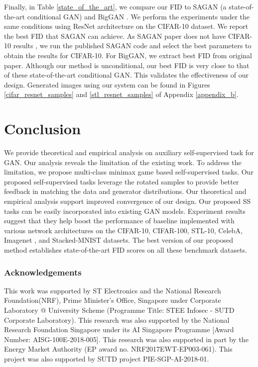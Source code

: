 \documentclass{article}
\begin{document}
Finally, in Table \ref{state_of_the_art}, we compare our FID to SAGAN \cite{zhang-arxiv-2018} (a state-of-the-art conditional GAN) and BigGAN \cite{brock-iclr-2018}. We perform the experiments under the same conditions using ResNet architecture on the  CIFAR-10 dataset. We report the best FID that SAGAN can achieve. As SAGAN paper does not have CIFAR-10 results \cite{zhang-arxiv-2018}, we run the published SAGAN code and select the best parameters to obtain the results for CIFAR-10. For BigGAN, we extract best FID from original paper. Although our method is unconditional, our best FID is very close  to that of these state-of-the-art conditional GAN. This validates the effectiveness of our design. 
Generated images using our system can be found in 
Figures \ref{cifar_resnet_samples} and \ref{stl_resnet_samples} of Appendix \ref{appendix_b}.



 
\section{Conclusion}

We provide theoretical and empirical analysis on auxiliary self-supervised task for GAN.
Our analysis reveals
the limitation of the existing work. To address the limitation, we propose multi-class minimax game based self-supervised tasks.
Our 
proposed self-supervised tasks leverage the rotated samples to provide better feedback in matching the data and generator distributions.
Our theoretical and empirical analysis support improved convergence of our design.
Our proposed SS tasks can be easily incorporated into existing GAN models. Experiment results suggest that they help boost the performance of baseline implemented with various network architectures on the CIFAR-10, CIFAR-100, STL-10, CelebA, Imagenet , and Stacked-MNIST datasets. The best version of our proposed method establishes state-of-the-art FID scores on all these benchmark datasets.

 





\pagebreak

\subsubsection*{Acknowledgements}

This work was  supported by ST Electronics and the National Research Foundation(NRF), Prime Minister's Office, Singapore under Corporate Laboratory @ University Scheme (Programme Title: STEE Infosec - SUTD Corporate Laboratory). This research was also supported by the National Research Foundation Singapore under its AI Singapore Programme [Award Number: AISG-100E-2018-005].
This research was also supported in part by the Energy Market Authority (EP award no. NRF2017EWT-EP003-061).
This project was  also supported by SUTD project PIE-SGP-AI-2018-01.
 
\end{document}
